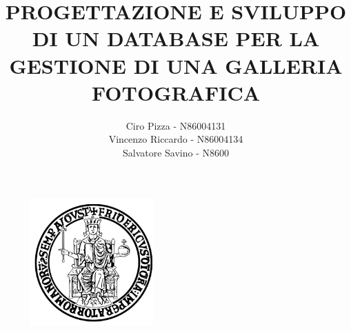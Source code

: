 \documentclass[a4paper]{article}
\begin{document}
\begin{figure}
	\begin{center}
    	\includegraphics[scale=0.6]{Immagini/FedericoII}
    \end{center}
\end{figure}

\title{PROGETTAZIONE E SVILUPPO DI UN DATABASE PER LA 
    	   GESTIONE DI UNA GALLERIA FOTOGRAFICA}
\author{Ciro Pizza - N86004131\\ Vincenzo Riccardo - N86004134\\ Salvatore Savino - N8600}
\maketitle

\newpage
\tableofcontents
\newpage
\end{document}
